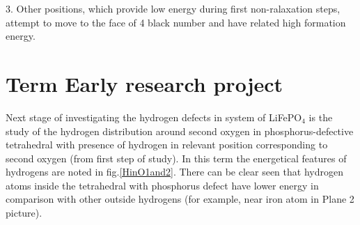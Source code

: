 \documentclass[11pt]{article}
\begin{document}
3. Other positions, which provide low energy during first non-ralaxation steps, attempt to move to the face of 4 black number and have related high formation energy.

\section{Term Early research project}

Next stage of investigating the hydrogen defects in system of LiFePO$_4$ is the study of the hydrogen distribution around second oxygen in phosphorus-defective tetrahedral with presence of hydrogen in relevant position corresponding to second oxygen (from first step of study). In this term the energetical features of hydrogens are noted in fig.\ref{HinO1and2}. There can be clear seen that hydrogen atoms inside the tetrahedral with phosphorus defect have lower energy in comparison with other outside hydrogens (for example, near iron atom in Plane 2 picture).
\end{document}
